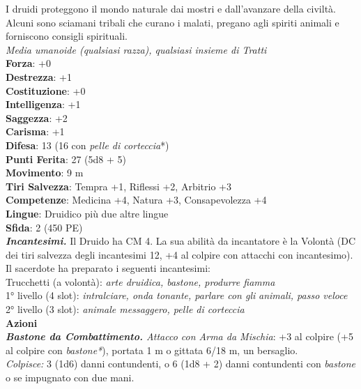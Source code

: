 \begin{multicols}{2}
I druidi proteggono il mondo naturale dai mostri e dall'avanzare della civiltà. Alcuni sono sciamani tribali che curano i malati, pregano agli spiriti animali e forniscono consigli spirituali.\\
\emph{Media umanoide (qualsiasi razza), qualsiasi insieme di Tratti}\\
\textbf{Forza}: +0\\
\textbf{Destrezza}: +1\\
\textbf{Costituzione}: +0\\
\textbf{Intelligenza}: +1\\
\textbf{Saggezza}: +2\\
\textbf{Carisma}: +1\\
\textbf{Difesa}: 13 (16 con \emph{pelle di corteccia}*)\\
\textbf{Punti Ferita}: 27 (5d8 + 5)\\
\textbf{Movimento}: 9 m\\
\textbf{Tiri Salvezza}: Tempra +1, Riflessi +2, Arbitrio +3 \\
\textbf{Competenze}: Medicina +4, Natura +3, Consapevolezza +4\\
\textbf{Lingue}: Druidico più due altre lingue\\
\textbf{Sfida}: 2 (450 PE)\smallskip\\
\emph{\textbf{Incantesimi.}} Il Druido ha CM 4. La sua abilità da incantatore è la Volontà (DC dei tiri salvezza degli incantesimi 12, +4 al colpire con attacchi con incantesimo). Il sacerdote ha preparato i seguenti incantesimi:\\
Trucchetti (a volontà): \emph{arte druidica, bastone, produrre fiamma}\\
1° livello (4 slot): \emph{intralciare, onda tonante, parlare con gli} \emph{animali, passo veloce}\\
2° livello (3 slot): \emph{animale messaggero, pelle di corteccia}\\
\smallskip\textbf{Azioni}\\
\emph{\textbf{Bastone da Combattimento.} Attacco con Arma da Mischia}: +3 al colpire (+5 al colpire con \emph{bastone*}), portata 1 m o gittata 6/18 m, un bersaglio. \\
\emph{Colpisce:} 3 (1d6) danni contundenti, o 6 (1d8 + 2) danni contundenti con \emph{bastone} o se impugnato con due mani.\\


\end{multicols}
